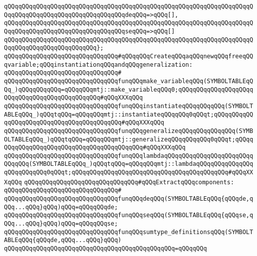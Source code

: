 \verb|qQQqqQQqqQQqqQQqqQQqqQQqqQQqqQQqqQQqqQQqqQQqqQQqqQQqqQQqqQQqqQQqqQQqqQQqqQQqqQQqqQQqqQQqqQQqqQQqqQQqqQQqdeqQQq=>qQQq[],|\newline
\verb|qQQqqQQqqQQqqQQqqQQqqQQqqQQqqQQqqQQqqQQqqQQqqQQqqQQqqQQqqQQqqQQqqQQqqQQqqQQqqQQqqQQqqQQqqQQqqQQqqQQqqQQqseqQQq=>qQQq[]|\newline
\verb|qQQqqQQqqQQqqQQqqQQqqQQqqQQqqQQqqQQqqQQqqQQqqQQqqQQqqQQqqQQqqQQqqQQqqQQqqQQqqQQqqQQqqQQqqQQqqQQq};|\newline
\newline
\verb|qQQqqQQqqQQqqQQqqQQqqQQqqQQqqQQq#qQQqqQQqCreateqQQqaqQQqnewqQQqfreeqQQqvariable;qQQqinstantiationqQQqandqQQqgeneralization:|\newline
\verb|qQQqqQQqqQQqqQQqqQQqqQQqqQQqqQQq#|\newline
\verb|qQQqqQQqqQQqqQQqqQQqqQQqqQQqqQQqfunqQQqmake_variableqQQq(SYMBOLTABLEqQQq_)qQQqqQQqqQQq=qQQqqQQqmtj::make_variableqQQq0;qQQqqQQqqQQqqQQqqQQqqQQqqQQqqQQqqQQqqQQqqQQqqQQq#qQQqXXXqQQq|\newline
\verb|qQQqqQQqqQQqqQQqqQQqqQQqqQQqqQQqfunqQQqinstantiateqQQqqQQqqQQq(SYMBOLTABLEqQQq_)qQQqtqQQq=qQQqqQQqmtj::instantiateqQQqqQQq0qQQqt;qQQqqQQqqQQqqQQqqQQqqQQqqQQqqQQqqQQqqQQqqQQq#qQQqXXXqQQq|\newline
\verb|qQQqqQQqqQQqqQQqqQQqqQQqqQQqqQQqfunqQQqgeneralizeqQQqqQQqqQQqqQQq(SYMBOLTABLEqQQq_)qQQqtqQQq=qQQqqQQqmtj::generalizeqQQqqQQqqQQq0qQQqt;qQQqqQQqqQQqqQQqqQQqqQQqqQQqqQQqqQQqqQQqqQQq#qQQqXXXqQQq|\newline
\verb|qQQqqQQqqQQqqQQqqQQqqQQqqQQqqQQqfunqQQqlambdaqQQqqQQqqQQqqQQqqQQqqQQqqQQqqQQq(SYMBOLTABLEqQQq_)qQQqtqQQq=qQQqqQQqmtj::lambdaqQQqqQQqqQQqqQQqqQQqqQQqqQQq0qQQqt;qQQqqQQqqQQqqQQqqQQqqQQqqQQqqQQqqQQqqQQqqQQq#qQQqXXXqQQq|\newline
\newline
\verb|qQQqqQQqqQQqqQQqqQQqqQQqqQQqqQQq#qQQqExtractqQQqcomponents:|\newline
\verb|qQQqqQQqqQQqqQQqqQQqqQQqqQQqqQQq#|\newline
\verb|qQQqqQQqqQQqqQQqqQQqqQQqqQQqqQQqfunqQQqdeqQQq(SYMBOLTABLEqQQq{qQQqde,qQQq...qQQq}qQQq)qQQq=qQQqqQQqde;|\newline
\verb|qQQqqQQqqQQqqQQqqQQqqQQqqQQqqQQqfunqQQqseqQQq(SYMBOLTABLEqQQq{qQQqse,qQQq...qQQq}qQQq)qQQq=qQQqqQQqse;|\newline
\newline
\verb|qQQqqQQqqQQqqQQqqQQqqQQqqQQqqQQqfunqQQqsumtype_definitionsqQQq(SYMBOLTABLEqQQq{qQQqde,qQQq...qQQq}qQQq)|\newline
\verb|qQQqqQQqqQQqqQQqqQQqqQQqqQQqqQQqqQQqqQQqqQQqqQQq=qQQqqQQq|\newline
